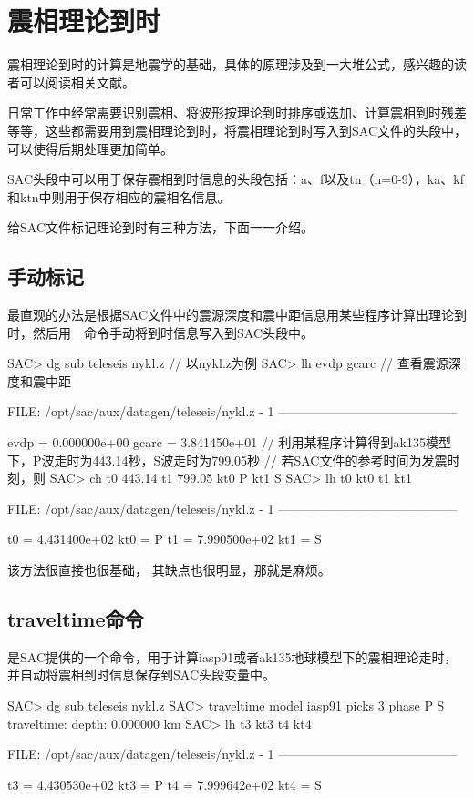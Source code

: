 \section{震相理论到时}
震相理论到时的计算是地震学的基础，具体的原理涉及到一大堆公式，感兴趣的读者可以阅读相关文献。

日常工作中经常需要识别震相、将波形按理论到时排序或迭加、计算震相到时残差等等，这些都需要用到震相理论到时，将震相理论到时写入到SAC文件的头段中，可以使得后期处理更加简单。

SAC头段中可以用于保存震相到时信息的头段包括：a、f以及tn（n=0-9），ka、kf和ktn中则用于保存相应的震相名信息。

给SAC文件标记理论到时有三种方法，下面一一介绍。

\subsection{手动标记}
最直观的办法是根据SAC文件中的震源深度和震中距信息用某些程序计算出理论到时，然后用~~命令手动将到时信息写入到SAC头段中。

\begin{SACCode}
SAC> dg sub teleseis nykl.z     // 以nykl.z为例
SAC> lh evdp gcarc         // 查看震源深度和震中距

  FILE: /opt/sac/aux/datagen/teleseis/nykl.z - 1
   ------------------------------------------

     evdp = 0.000000e+00
    gcarc = 3.841450e+01
// 利用某程序计算得到ak135模型下，P波走时为443.14秒，S波走时为799.05秒
// 若SAC文件的参考时间为发震时刻，则
SAC> ch t0 443.14 t1 799.05 kt0 P kt1 S
SAC> lh t0 kt0 t1 kt1

    FILE: /opt/sac/aux/datagen/teleseis/nykl.z - 1
    ------------------------------------------

     t0 = 4.431400e+02
    kt0 = P
     t1 = 7.990500e+02
    kt1 = S
\end{SACCode}

该方法很直接也很基础， 其缺点也很明显，那就是麻烦。

\subsection{traveltime命令}
是SAC提供的一个命令，用于计算iasp91或者ak135地球模型下的震相理论走时，并自动将震相到时信息保存到SAC头段变量中。

\begin{SACCode}
SAC> dg sub teleseis nykl.z
SAC> traveltime model iasp91 picks 3 phase P S
traveltime: depth: 0.000000 km
SAC> lh t3 kt3 t4 kt4

  FILE: /opt/sac/aux/datagen/teleseis/nykl.z - 1
   ------------------------------------------

         t3 = 4.430530e+02
        kt3 = P
         t4 = 7.999642e+02
        kt4 = S
\end{SACCode}

